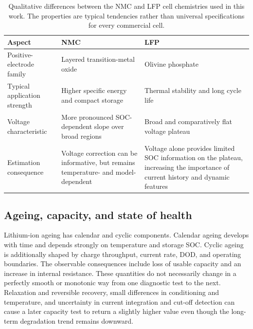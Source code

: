 \documentclass[
    a4paper,
    12pt,
    titlepage,
    bibliography=totoc,
    twoside=on,
    parskip=false,
    numbers=noenddot,
    cleardoublepage=empty,
    DIV=12,
    BCOR=12.0mm,
    headheight=36pt,
    headings=openright
]{scrreprt}
\begin{document}
\begin{table}[H]
    \centering
    \small
    \caption[Estimation-relevant differences between NMC and LFP cells.]{Qualitative differences between the NMC and LFP cell chemistries used in this work. The properties are typical tendencies rather than universal specifications for every commercial cell.}
    \label{tab:nmc_lfp_foundations}
    \begin{tabularx}{\textwidth}{>{\raggedright\arraybackslash}p{3.2cm}YY}
        \toprule
        Aspect & NMC & LFP \\
        \midrule
        Positive-electrode family & Layered transition-metal oxide & Olivine phosphate \\
        Typical application strength & Higher specific energy and compact storage & Thermal stability and long cycle life \\
        Voltage characteristic & More pronounced SOC-dependent slope over broad regions & Broad and comparatively flat voltage plateau \\
        Estimation consequence & Voltage correction can be informative, but remains temperature- and model-dependent & Voltage alone provides limited SOC information on the plateau, increasing the importance of current history and dynamic features \\
        \bottomrule
    \end{tabularx}
\end{table}

\subsection{Ageing, capacity, and state of health}
Lithium-ion ageing has calendar and cyclic components. Calendar ageing develops with time and depends strongly on temperature and storage SOC. Cyclic ageing is additionally shaped by charge throughput, current rate, DOD, and operating boundaries. The observable consequences include loss of usable capacity and an increase in internal resistance. These quantities do not necessarily change in a perfectly smooth or monotonic way from one diagnostic test to the next. Relaxation and reversible recovery, small differences in conditioning and temperature, and uncertainty in current integration and cut-off detection can cause a later capacity test to return a slightly higher value even though the long-term degradation trend remains downward.\autocite{kassemCalendarAgingGraphite2012,baraiComparisonMethodologiesNoninvasive2019,berecibarCriticalReviewState2016}
\end{document}
